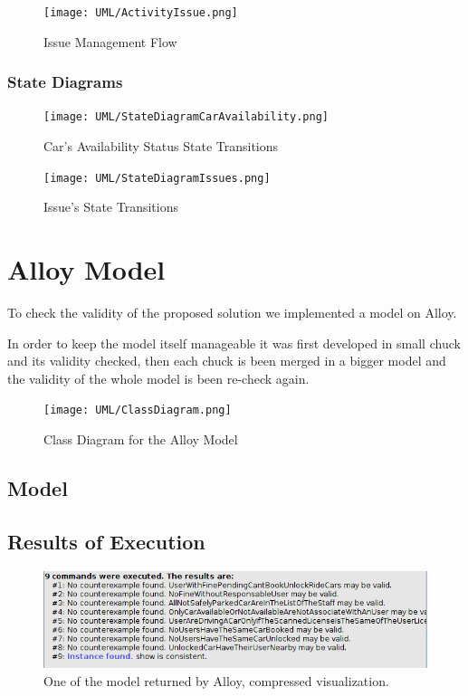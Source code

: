 \documentclass[11pt]{article} %
\begin{document}
\begin{figure}[H]
	\centering
	\texttt{[image: UML/ActivityIssue.png]}
	\caption{Issue Management Flow}
\end{figure}
\newpage


\subsubsection{State Diagrams}
\begin{figure}[H]
	\centering
	\texttt{[image: UML/StateDiagramCarAvailability.png]}
	\caption{Car's Availability Status State Transitions}
\end{figure}
\begin{figure}[H]
	\centering
	\texttt{[image: UML/StateDiagramIssues.png]}
	\caption{Issue's State Transitions}
\end{figure}



\newpage
\section{Alloy Model}

To check the validity of the proposed solution we implemented a model on Alloy.

In order to keep the model itself manageable it was first developed in small chuck and its validity checked, then each chuck is been merged in a bigger model and the validity of the whole model is been re-check again.

\begin{figure}[H]
	\centering
	\texttt{[image: UML/ClassDiagram.png]}
	\caption{Class Diagram for the Alloy Model}
\end{figure}

\subsection{Model}



\subsection{Results of Execution}

\begin{figure}[H]
	\centering
	\includegraphics[width=1\textwidth]{Alloy/ConsistentStatic.png}
	\caption{One of the model returned by Alloy, compressed visualization.}
\end{figure}
\end{document}
